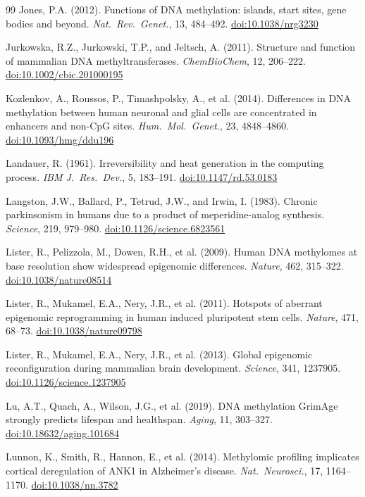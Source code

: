 \documentclass[12pt,a4paper]{article}
\newcommand{\doi}[1]{\href{https://doi.org/#1}{doi:#1}}
\begin{document}
\begin{thebibliography}{99}
Jones, P.A. (2012).
Functions of DNA methylation: islands, start sites, gene bodies and beyond.
\textit{Nat.\ Rev.\ Genet.}, 13, 484--492.
\doi{10.1038/nrg3230}

Jurkowska, R.Z., Jurkowski, T.P., and Jeltsch, A. (2011).
Structure and function of mammalian DNA methyltransferases.
\textit{ChemBioChem}, 12, 206--222.
\doi{10.1002/cbic.201000195}

Kozlenkov, A., Roussos, P., Timashpolsky, A., et al. (2014).
Differences in DNA methylation between human neuronal and glial cells are concentrated in enhancers and non-CpG sites.
\textit{Hum.\ Mol.\ Genet.}, 23, 4848--4860.
\doi{10.1093/hmg/ddu196}

Landauer, R. (1961).
Irreversibility and heat generation in the computing process.
\textit{IBM J.\ Res.\ Dev.}, 5, 183--191.
\doi{10.1147/rd.53.0183}

Langston, J.W., Ballard, P., Tetrud, J.W., and Irwin, I. (1983).
Chronic parkinsonism in humans due to a product of meperidine-analog synthesis.
\textit{Science}, 219, 979--980.
\doi{10.1126/science.6823561}

Lister, R., Pelizzola, M., Dowen, R.H., et al. (2009).
Human DNA methylomes at base resolution show widespread epigenomic differences.
\textit{Nature}, 462, 315--322.
\doi{10.1038/nature08514}

Lister, R., Mukamel, E.A., Nery, J.R., et al. (2011).
Hotspots of aberrant epigenomic reprogramming in human induced pluripotent stem cells.
\textit{Nature}, 471, 68--73.
\doi{10.1038/nature09798}

Lister, R., Mukamel, E.A., Nery, J.R., et al. (2013).
Global epigenomic reconfiguration during mammalian brain development.
\textit{Science}, 341, 1237905.
\doi{10.1126/science.1237905}

Lu, A.T., Quach, A., Wilson, J.G., et al. (2019).
DNA methylation GrimAge strongly predicts lifespan and healthspan.
\textit{Aging}, 11, 303--327.
\doi{10.18632/aging.101684}

Lunnon, K., Smith, R., Hannon, E., et al. (2014).
Methylomic profiling implicates cortical deregulation of ANK1 in Alzheimer's disease.
\textit{Nat.\ Neurosci.}, 17, 1164--1170.
\doi{10.1038/nn.3782}


\end{thebibliography}
\end{document}
